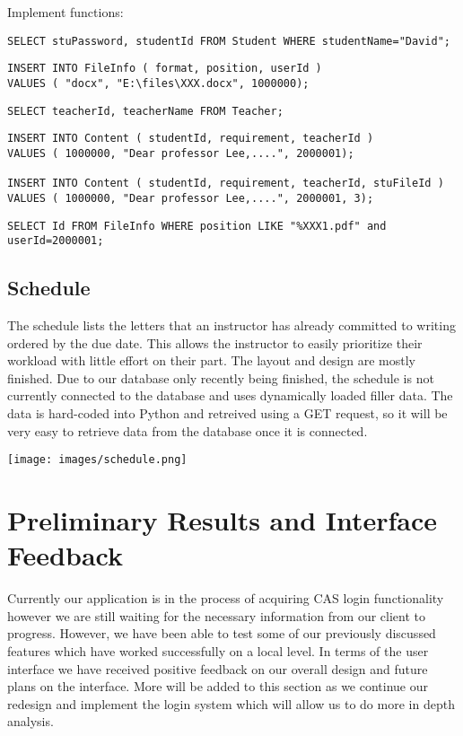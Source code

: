 \documentclass[draftclsnofoot, onecolumn, letterpaper, 10pt]{IEEEtran}
\begin{document}
Implement functions:
\begin{lstlisting}[caption={Login as student},captionpos=b]
SELECT stuPassword, studentId FROM Student WHERE studentName="David";
\end{lstlisting}
\begin{lstlisting}[caption={Student upload files},captionpos=b]
INSERT INTO FileInfo ( format, position, userId ) 
VALUES ( "docx", "E:\files\XXX.docx", 1000000);
\end{lstlisting}
\begin{lstlisting}[caption={Select teacher},captionpos=b]
SELECT teacherId, teacherName FROM Teacher;
\end{lstlisting}
\begin{lstlisting}[caption={Students writes requirements with or without attachment},captionpos=b]
INSERT INTO Content ( studentId, requirement, teacherId ) 
VALUES ( 1000000, "Dear professor Lee,....", 2000001);

INSERT INTO Content ( studentId, requirement, teacherId, stuFileId ) 
VALUES ( 1000000, "Dear professor Lee,....", 2000001, 3);
\end{lstlisting}

\begin{lstlisting}[caption={Get file ID uploaded by techer},captionpos=b]
SELECT Id FROM FileInfo WHERE position LIKE "%XXX1.pdf" and userId=2000001;
\end{lstlisting}


 
\subsection{Schedule}
The schedule lists the letters that an instructor has already committed to writing ordered by the due date. This allows the instructor to easily prioritize their workload with little effort on their part. The layout and design are mostly finished. Due to our database only recently being finished, the schedule is not currently connected to the database and uses dynamically loaded filler data. The data is hard-coded into Python and retreived using a GET request, so it will be very easy to retrieve data from the database once it is connected.

\texttt{[image: images/schedule.png]}

\section{Preliminary Results and Interface Feedback}
Currently our application is in the process of acquiring CAS login functionality however we are still waiting for the necessary information from our client to progress. However, we have been able to test some of our previously discussed features which have worked successfully on a local level. In terms of the user interface we have received positive feedback on our overall design and future plans on the interface. More will be added to this section as we continue our redesign and implement the login system which will allow us to do more in depth analysis. 
\end{document}
